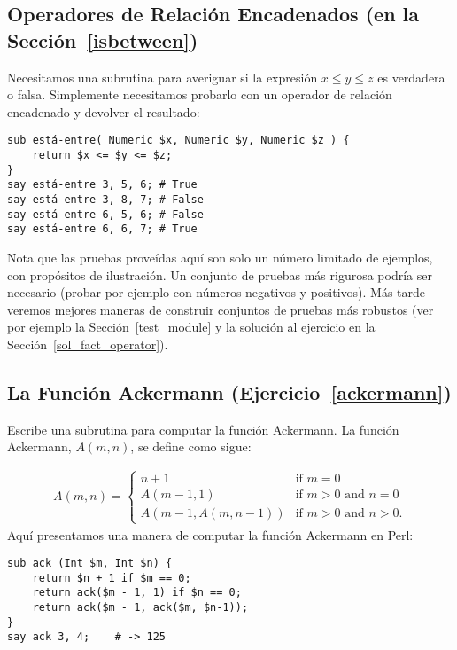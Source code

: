\subsection{Operadores de Relación Encadenados (en la Sección~\ref{isbetween})}
\label{sol_isbetween}

Necesitamos una subrutina para averiguar si la expresión $x \le y \le z$
es verdadera o falsa. Simplemente necesitamos probarlo con un operador
de relación encadenado y devolver el resultado:

\begin{verbatim}
sub está-entre( Numeric $x, Numeric $y, Numeric $z ) {
    return $x <= $y <= $z;
}
say está-entre 3, 5, 6; # True
say está-entre 3, 8, 7; # False
say está-entre 6, 5, 6; # False
say está-entre 6, 6, 7; # True
\end{verbatim}
%

Nota que las pruebas proveídas aquí son solo un número limitado 
de ejemplos, con propósitos de ilustración. Un conjunto de pruebas
más rigurosa podría ser necesario (probar por ejemplo con números
negativos y positivos). Más tarde veremos mejores maneras de 
construir conjuntos de pruebas más robustos (ver por ejemplo la 
Sección~\ref{test_module} y la solución al ejercicio en la  
Sección~\ref{sol_fact_operator}).


\subsection{La Función Ackermann (Ejercicio~\ref{ackermann})}
\label{sol_ackermann}

Escribe una subrutina para computar la función Ackermann.
La función Ackermann, $A(m, n)$, se define como sigue:

\begin{eqnarray*}
A(m, n) = \begin{cases} 
              n+1 & \mbox{if } m = 0 \\ 
        A(m-1, 1) & \mbox{if } m > 0 \mbox{ and } n = 0 \\ 
A(m-1, A(m, n-1)) & \mbox{if } m > 0 \mbox{ and } n > 0.
\end{cases} 
\end{eqnarray*}
%
Aquí presentamos una manera de computar la función
Ackermann en Perl:

\begin{verbatim}
sub ack (Int $m, Int $n) {
    return $n + 1 if $m == 0;
    return ack($m - 1, 1) if $n == 0;
    return ack($m - 1, ack($m, $n-1));
}
say ack 3, 4;    # -> 125
\end{verbatim}

